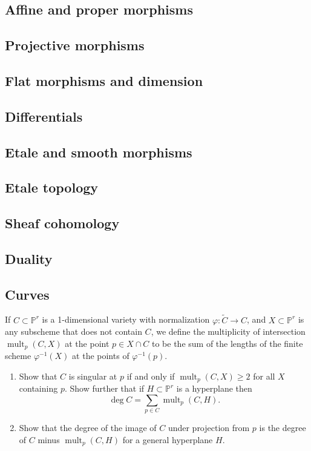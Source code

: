 \documentclass[12pt]{article}
\begin{document}
\subsection{Affine and proper morphisms}
\subsection{Projective morphisms}
\subsection{Flat morphisms and dimension}
\subsection{Differentials}
\subsection{Etale and smooth morphisms}
\subsection{Etale topology}
\subsection{Sheaf cohomology}
\subsection{Duality}
\subsection{Curves}


\begin{exercise}[POAC 2.2]
If $C \subset \mathbb{P}^r$ is a 1-dimensional variety with normalization 
$\varphi : \widetilde{C} \to C$, and $X \subset \mathbb{P}^r$ is any subscheme that does not contain $C$, we define the multiplicity of intersection $\operatorname{mult}_p(C,X)$ at the point $p \in X \cap C$ to be the sum of the lengths of the finite scheme $\varphi^{-1}(X)$ at the points of $\varphi^{-1}(p)$.


\begin{enumerate}
  \item Show that $C$ is singular at $p$ if and only if 
  $\operatorname{mult}_p(C,X) \geq 2$ for all $X$ containing $p$. 
  Show further that if $H \subset \mathbb{P}^r$ is a hyperplane then
  \[
    \deg C = \sum_{p \in C} \operatorname{mult}_p(C,H).
  \]

  \item Show that the degree of the image of $C$ under projection from $p$ 
  is the degree of $C$ minus $\operatorname{mult}_p(C,H)$ for a general hyperplane $H$.
\end{enumerate}
\end{exercise}
\end{document}

